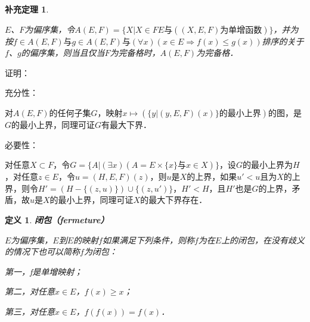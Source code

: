 \documentclass[12pt, a4paper, oneside]{book}
\newtheorem{cor}{补充定理}
\newtheorem{de}{定义}
\begin{document}
			\begin{cor}\label{cor197}
				\hfill\par
				$E$、$F$为偏序集，令$A(E, F)=\{X|X\in FE\text{与}((X, E, F)\text{为单增函数})\}$，并为按$f\in A(E, F)\text{与}g\in A(E, F)\text{与}(\forall x)(x\in E\Rightarrow f(x)\leq g(x))$排序的关于$f$、$g$的偏序集，则当且仅当$F$为完备格时，$A(E, F)$为完备格．
			\end{cor}
			证明：
			\par
			充分性：
			\par
			对$A(E, F)$的任何子集$G$，映射$x\mapsto (\{y|(y, E, F)(x)\}\text{的最小上界})$的图，是$G$的最小上界，同理可证$G$有最大下界．
			\par
			必要性：
			\par
			对任意$X\subset F$，令$G=\{A|(\exists x)(A=E\times \{x\}\text{与}x\in X)\}$，设$G$的最小上界为$H$，对任意$z\in E$，令$u=(H, E, F)(z)$，则$u$是$X$的上界，如果$u'<u$且为$X$的上界，则令$H'=(H-\{(z, u)\})\cup\{(z, u')\}$，$H'<H$，且$H'$也是$G$的上界，矛盾，故$u$是$X$的最小上界，同理可证$X$的最大下界存在．

			\begin{de}
				\textbf{闭包（fermeture）}
				\par
				$E$为偏序集，$E$到$E$的映射$f$如果满足下列条件，则称$f$为在$E$上的闭包，在没有歧义的情况下也可以简称$f$为闭包：
				\par
				第一，f是单增映射；
				\par
				第二，对任意$x\in E$，$f(x)\geq x$；
				\par
				第三，对任意$x\in E$，$f(f(x))=f(x)$．
			\end{de}
			
\end{document}
